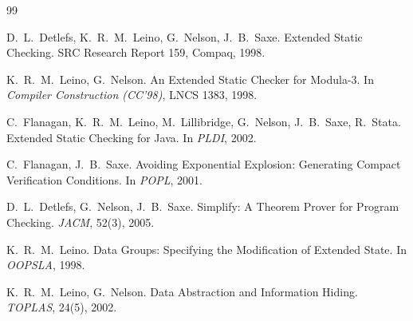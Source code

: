 \documentclass[11pt]{article}
\begin{document}
\begin{thebibliography}{99}

D.~L.~Detlefs, K.~R.~M.~Leino, G.~Nelson, J.~B.~Saxe.
\newblock Extended Static Checking.
\newblock SRC Research Report 159, Compaq, 1998.

K.~R.~M.~Leino, G.~Nelson.
\newblock An Extended Static Checker for Modula-3.
\newblock In \emph{Compiler Construction (CC'98)}, LNCS 1383, 1998.

C.~Flanagan, K.~R.~M.~Leino, M.~Lillibridge, G.~Nelson, J.~B.~Saxe,
R.~Stata.
\newblock Extended Static Checking for Java.
\newblock In \emph{PLDI}, 2002.

C.~Flanagan, J.~B.~Saxe.
\newblock Avoiding Exponential Explosion: Generating Compact
Verification Conditions.
\newblock In \emph{POPL}, 2001.

D.~L.~Detlefs, G.~Nelson, J.~B.~Saxe.
\newblock Simplify: A Theorem Prover for Program Checking.
\newblock \emph{JACM}, 52(3), 2005.

K.~R.~M.~Leino.
\newblock Data Groups: Specifying the Modification of Extended State.
\newblock In \emph{OOPSLA}, 1998.

K.~R.~M.~Leino, G.~Nelson.
\newblock Data Abstraction and Information Hiding.
\newblock \emph{TOPLAS}, 24(5), 2002.

\end{thebibliography}
\end{document}
